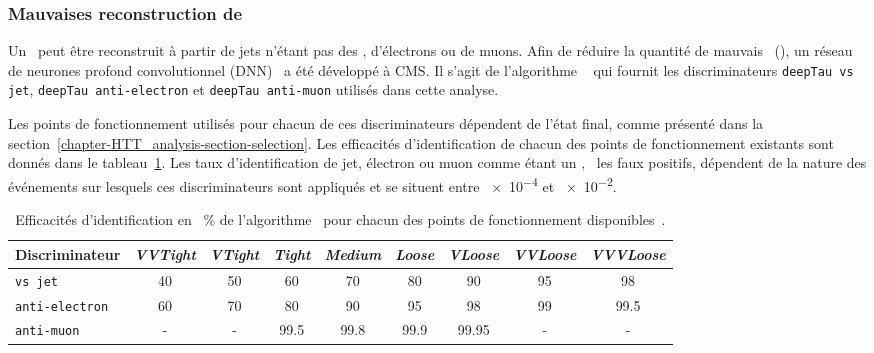 \subsubsection{Mauvaises reconstruction de \tauh}
Un \tauh\ peut être reconstruit à partir de jets n'étant pas des \tauh, d'électrons ou de muons.
Afin de réduire la quantité de mauvais \tauh\ (\ftauh), un réseau de neurones profond convolutionnel (DNN)~\cite{DNN} a été développé à CMS.
Il s'agit de l'algorithme \DEEPTAU~\cite{CMS-DP-2019-033} qui fournit les discriminateurs
\texttt{deepTau vs jet},
\texttt{deepTau anti-electron} et
\texttt{deepTau anti-muon}
utilisés dans cette analyse.
\par
Les points de fonctionnement utilisés pour chacun de ces discriminateurs dépendent de l'état final, comme présenté dans la section~\ref{chapter-HTT_analysis-section-selection}.
Les efficacités d'identification de chacun des points de fonctionnement existants sont donnés dans le tableau~\ref{tab-HTT_analysis-section-objects-taus-DEEPTAU_eff}.
Les taux d'identification de jet, électron ou muon comme étant un \tauh, \ie\ les faux positifs, dépendent de la nature des événements sur lesquels ces discriminateurs sont appliqués et se situent entre \num{e-4} et \num{e-2}.
\begin{table}[h]
\centering
\begin{tabular}{lcccccccc}
\toprule
Discriminateur & \emph{VVTight} & \emph{VTight} & \emph{Tight} & \emph{Medium} & \emph{Loose} & \emph{VLoose} & \emph{VVLoose} & \emph{VVVLoose}\\
\midrule
\texttt{vs jet} & \num{40} & \num{50} & \num{60} & \num{70} & \num{80} & \num{90} & \num{95} & \num{98} \\
\texttt{anti-electron} & \num{60} & \num{70} & \num{80} & \num{90} & \num{95} & \num{98} & \num{99} & \num{99.5} \\
\texttt{anti-muon} & - & - & \num{99.5} & \num{99.8} & \num{99.9} & \num{99.95} & - & - \\
\bottomrule
\end{tabular}
\caption[Efficacités d'identification de l'algorithme \DEEPTAU.]{Efficacités d'identification en \SI{}{\%} de l'algorithme \DEEPTAU\ pour chacun des points de fonctionnement disponibles~\cite{CMS-DP-2019-033,Androsov_deeptau}.}
\label{tab-HTT_analysis-section-objects-taus-DEEPTAU_eff}
\end{table}
